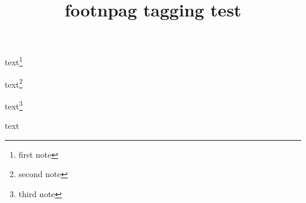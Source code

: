 \documentclass{article}
\title{footnpag tagging test}
\begin{document}
text\footnote{first note}

text\footnote{second note}

\newpage

text\footnote{third note}

text\footnotemark

\end{document}
